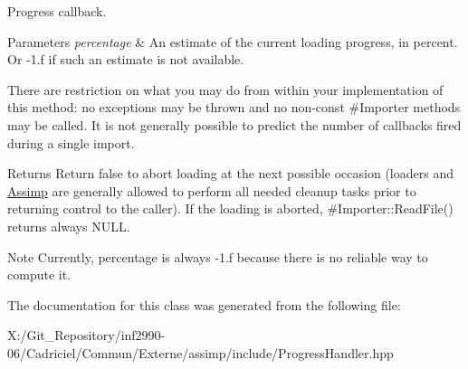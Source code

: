 Progress callback. 


\begin{DoxyParams}{Parameters}
{\em percentage} & An estimate of the current loading progress, in percent. Or -\/1.\-f if such an estimate is not available.\\
\hline
\end{DoxyParams}
There are restriction on what you may do from within your implementation of this method\-: no exceptions may be thrown and no non-\/const \#\-Importer methods may be called. It is not generally possible to predict the number of callbacks fired during a single import.

\begin{DoxyReturn}{Returns}
Return false to abort loading at the next possible occasion (loaders and \hyperlink{namespace_assimp}{Assimp} are generally allowed to perform all needed cleanup tasks prior to returning control to the caller). If the loading is aborted, \#\-Importer\-::\-Read\-File() returns always N\-U\-L\-L.
\end{DoxyReturn}
\begin{DoxyNote}{Note}
Currently, percentage is always -\/1.\-f because there is no reliable way to compute it. 
\end{DoxyNote}


The documentation for this class was generated from the following file\-:\begin{DoxyCompactItemize}
\item 
X\-:/\-Git\-\_\-\-Repository/inf2990-\/06/\-Cadriciel/\-Commun/\-Externe/assimp/include/Progress\-Handler.\-hpp\end{DoxyCompactItemize}
